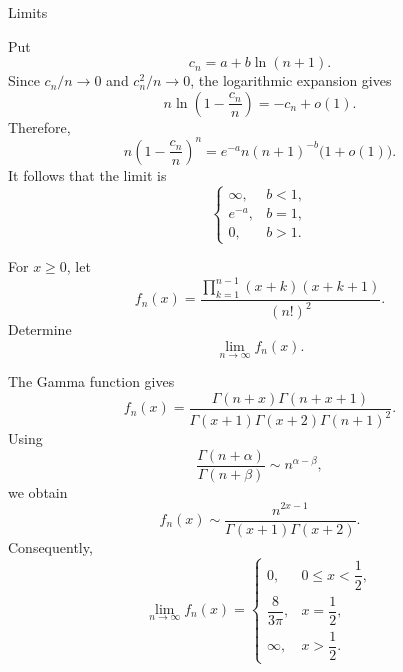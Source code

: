 \begin{expectedproblemgroup}{Limits}
        \begin{expectedsubsolution}
            Put
            \[
                c_n=a+b\ln(n+1).
            \]
            Since $c_n/n\to0$ and $c_n^2/n\to0$, the logarithmic expansion gives
            \[
                n\ln\left(1-\frac{c_n}{n}\right)
                =
                -c_n+o(1).
            \]
            Therefore,
            \[
                n\left(1-\frac{c_n}{n}\right)^n
                =
                e^{-a}n(n+1)^{-b}\bigl(1+o(1)\bigr).
            \]
            It follows that the limit is
            \[
                \boxed{
                    \begin{cases}
                        \infty, & b<1,\\
                        e^{-a}, & b=1,\\
                        0, & b>1.
                    \end{cases}
                }
            \]
        \end{expectedsubsolution}

        \begin{expectedsubproblem}
            For $x\geq0$, let
            \[
                f_n(x)
                =
                \frac{
                    \displaystyle\prod_{k=1}^{n-1}(x+k)(x+k+1)
                }{(n!)^2}.
            \]
            Determine
            \[
                \lim\limits_{n\to\infty}f_n(x).
            \]
        \end{expectedsubproblem}

        \begin{expectedsubsolution}
            The Gamma function gives
            \[
                f_n(x)
                =
                \frac{\Gamma(n+x)\Gamma(n+x+1)}
                {\Gamma(x+1)\Gamma(x+2)\Gamma(n+1)^2}.
            \]
            Using
            \[
                \frac{\Gamma(n+\alpha)}{\Gamma(n+\beta)}
                \sim n^{\alpha-\beta},
            \]
            we obtain
            \[
                f_n(x)
                \sim
                \frac{n^{2x-1}}{\Gamma(x+1)\Gamma(x+2)}.
            \]
            Consequently,
            \[
                \boxed{
                    \lim\limits_{n\to\infty}f_n(x)
                    =
                    \begin{cases}
                        0, & 0\leq x<\dfrac12,\\[4pt]
                        \dfrac{8}{3\pi}, & x=\dfrac12,\\[6pt]
                        \infty, & x>\dfrac12.
                    \end{cases}
                }
            \]
        \end{expectedsubsolution}


\end{expectedproblemgroup}
